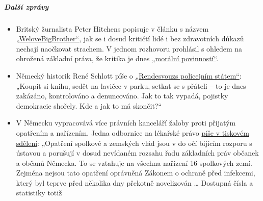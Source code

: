 \hypertarget{dalux161uxed-zpruxe1vy}{%
\subparagraph{\texorpdfstring{\textbf{Další
zprávy}}{Další zprávy}}\label{dalux161uxed-zpruxe1vy}}

\begin{itemize}
\tightlist
\item
  Britský žurnalista Peter Hitchens popisuje v článku s názvem
  \href{https://www.firstthings.com/web-exclusives/2020/04/we-love-big-brother\%20/t\%20_blank}{„}\href{https://www.firstthings.com/web-exclusives/2020/04/we-love-big-brother\%20/t\%20_blank}{We}\href{https://www.firstthings.com/web-exclusives/2020/04/we-love-big-brother\%20/t\%20_blank}{love}\href{https://www.firstthings.com/web-exclusives/2020/04/we-love-big-brother\%20/t\%20_blank}{Big}\href{https://www.firstthings.com/web-exclusives/2020/04/we-love-big-brother\%20/t\%20_blank}{Brother``},
  jak se i dosud kritičtí lidé i bez zdravotních důkazů nechají
  naočkovat strachem. V jednom rozhovoru prohlásil s ohledem na ohrožená
  základní práva, že kritika je dnes
  \href{https://www.spiked-online.com/podcast-episode/in-this-lockdown-dissent-is-a-moral-duty/}{„morální
  povinností``}.
\item
  Německý historik René Schlott píše o
  \href{https://www.spiegel.de/politik/deutschland/corona-krise-und-buergerrechte-rendezvous-mit-dem-polizeistaat-a-68611322-f4d4-453f-aba5-5ec5a49ae329\%20/t\%20_blank}{„}\href{https://www.spiegel.de/politik/deutschland/corona-krise-und-buergerrechte-rendezvous-mit-dem-polizeistaat-a-68611322-f4d4-453f-aba5-5ec5a49ae329\%20/t\%20_blank}{Rendesvouz}\href{https://www.spiegel.de/politik/deutschland/corona-krise-und-buergerrechte-rendezvous-mit-dem-polizeistaat-a-68611322-f4d4-453f-aba5-5ec5a49ae329\%20/t\%20_blank}{s
  policejním státem``}: „Koupit si knihu, sedět na lavičce v parku,
  setkat se s přáteli -- to je dnes zakázáno, kontrolováno a
  denuncováno. Jak to tak vypadá, pojistky demokracie shořely. Kde a jak
  to má skončit?``
\item
  V Německu vypracovává více právních kanceláří žaloby proti přijatým
  opatřením a nařízením. Jedna odbornice na lékařské právo
  \href{http://beatebahner.de/lib.medien/aktualisierte\%20Pressemitteilung.pdf}{píše
  v tiskovém sdělení}: „Opatření spolkové a zemských vlád jsou v do očí
  bijícím rozporu s ústavou a porušují v dosud nevídaném rozsahu řadu
  základních práv občanek a občanů Německa. To se vztahuje na všechna
  nařízení 16 spolkových zemí. Zejména nejsou tato opatření oprávněná
  Zákonem o ochraně před infekcemi, který byl teprve před několika dny
  překotně novelizován \ldots{} Dostupná čísla a statistiky totiž

\end{itemize}
